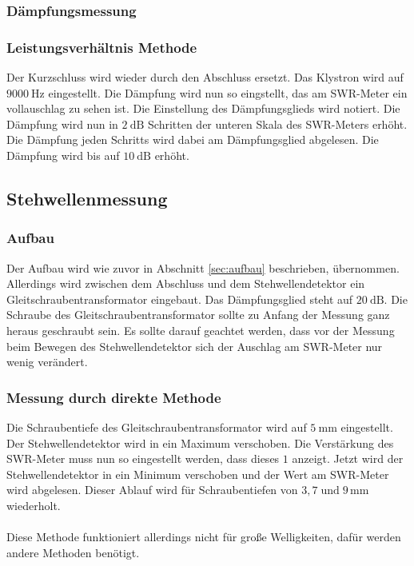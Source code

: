 \subsubsection{Dämpfungsmessung}
\subsubsection{Leistungsverhältnis Methode}
Der Kurzschluss wird wieder durch den Abschluss ersetzt.
Das Klystron wird auf $\SI{9000}{\Hz}$ eingestellt.
Die Dämpfung wird nun so eingstellt, das am SWR-Meter ein vollauschlag zu sehen ist.
Die Einstellung des Dämpfungsglieds wird notiert.
Die Dämpfung wird nun in $\SI{2}{\dB}$ Schritten der unteren Skala des SWR-Meters erhöht.
Die Dämpfung jeden Schritts wird dabei am Dämpfungsglied abgelesen.
Die Dämpfung wird bis auf $\SI{10}{\dB}$ erhöht.

\subsection{Stehwellenmessung}
\subsubsection{Aufbau}
Der Aufbau wird wie zuvor in Abschnitt \ref{sec:aufbau} beschrieben, übernommen.
Allerdings wird zwischen dem Abschluss und dem Stehwellendetektor ein Gleitschraubentransformator eingebaut.
Das Dämpfungsglied steht auf $\SI{20}{\dB}$.
Die Schraube des Gleitschraubentransformator sollte zu Anfang der Messung ganz heraus geschraubt sein.
Es sollte darauf geachtet werden, dass vor der Messung beim Bewegen des Stehwellendetektor sich der Auschlag am SWR-Meter nur wenig verändert.

\subsubsection{Messung durch direkte Methode}
Die Schraubentiefe des Gleitschraubentransformator wird auf $\SI{5}{\milli\meter}$ eingestellt.
Der Stehwellendetektor wird in ein Maximum verschoben.
Die Verstärkung des SWR-Meter muss nun so eingestellt werden, dass dieses $1$ anzeigt.
Jetzt wird der Stehwellendetektor in ein Minimum verschoben und der Wert am SWR-Meter wird abgelesen.
Dieser Ablauf wird für Schraubentiefen von $3,7 \; \text{und} \; 9 \, \si{\milli\meter}$ wiederholt.
\\\\
Diese Methode funktioniert allerdings nicht für große Welligkeiten, dafür werden andere Methoden benötigt.
